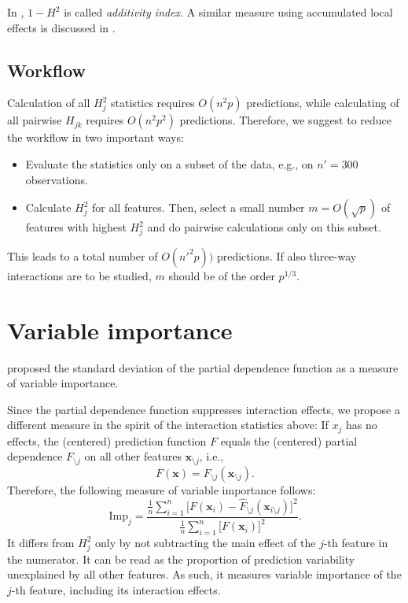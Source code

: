 \documentclass[]{article}
\begin{document}
In \cite{zolkowski2023}, $1 - H^2$ is called {\em additivity index}. A similar measure using accumulated local effects is discussed in \cite{molnar2020}.

\subsection{Workflow}
Calculation of all $H_j^2$ statistics requires $O(n^2p)$ predictions, while calculating of all pairwise $H_{jk}$ requires $O(n^2 p^2)$ predictions. Therefore, we suggest to reduce the workflow in two important ways:
\begin{itemize}
\item Evaluate the statistics only on a subset of the data, e.g., on $n' = 300$ observations.
\item Calculate $H_j^2$ for all features. Then, select a small number $m = O(\sqrt{p})$ of features with highest $H^2_j$ and do pairwise calculations only on this subset.
\end{itemize}
This leads to a total number of $O(n'^2 p))$ predictions. If also three-way interactions are to be studied, $m$ should be of the order $p^{1/3}$.

\section{Variable importance}

\cite{greenwell2018} proposed the standard deviation of the partial dependence function as a measure of variable importance. 

Since the partial dependence function suppresses interaction effects, we propose a different measure in the spirit of the interaction statistics above: If $x_j$ has no effects, the (centered) prediction function $F$ equals the (centered) partial dependence $F_{\setminus j}$ on all other features $\mathbf{x}_{\setminus j}$, i.e.,
$$
	F(\mathbf{x}) = F_{\setminus j}(\mathbf{x}_{\setminus j}).
$$
Therefore, the following measure of variable importance follows:
$$
	\textrm{Imp}_j = \frac{\frac{1}{n} \sum_{i = 1}^n\big[F(\mathbf{x}_i) - \hat F_{\setminus j}(\mathbf{x}_{i\setminus j})\big]^2}{\frac{1}{n} \sum_{i = 1}^n\big[F(\mathbf{x}_i)\big]^2}.
$$
It differs from $H^2_j$ only by not subtracting the main effect of the $j$-th feature in the numerator. It can be read as the proportion of prediction variability unexplained by all other features. As such, it measures variable importance of the $j$-th feature, including its interaction effects.
\end{document}
